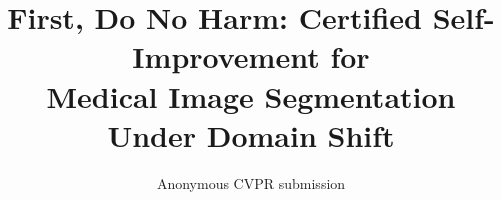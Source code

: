 \documentclass[10pt,twocolumn,letterpaper]{article}
\title{First, Do No Harm: Certified Self-Improvement for\\Medical Image Segmentation Under Domain Shift}
\author{Anonymous CVPR submission}
\newif\ifwithsuppl
\begin{document}
\maketitle










{
    \small
    
    
}

\ifwithsuppl

\fi
\end{document}

